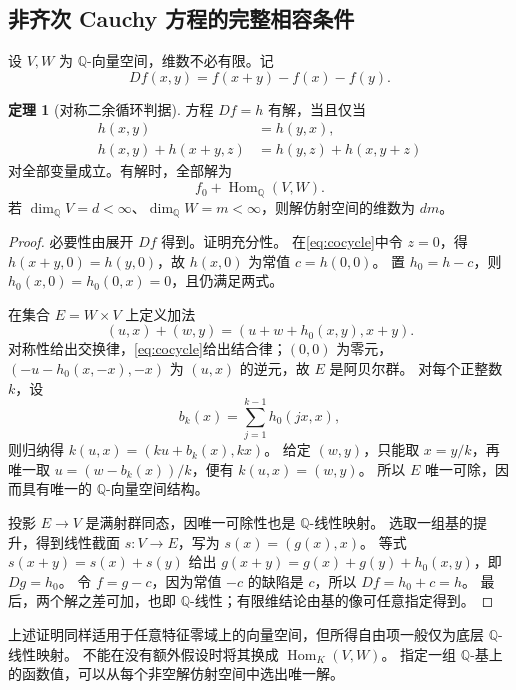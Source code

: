 \documentclass[UTF8,11pt,a4paper]{ctexart}
\theoremstyle{definition}
\newtheorem{theorem}{定理}[section]
\newcommand{\Q}{\mathbb Q}
\newcommand{\Hom}{\operatorname{Hom}}
\numberwithin{equation}{section}
\begin{document}
\subsection{非齐次 Cauchy 方程的完整相容条件}
设 $V,W$ 为 $\Q$-向量空间，维数不必有限。记
\[
 Df(x,y)=f(x+y)-f(x)-f(y).
\]
\begin{theorem}[对称二余循环判据]\label{thm:cocycle}
方程 $Df=h$ 有解，当且仅当
\begin{align}
 h(x,y)&=h(y,x),\label{eq:sym}\\
 h(x,y)+h(x+y,z)&=h(y,z)+h(x,y+z)\label{eq:cocycle}
\end{align}
对全部变量成立。有解时，全部解为
\[
 f_0+\Hom_{\Q}(V,W).
\]
若 $\dim_{\Q}V=d<\infty$、$\dim_{\Q}W=m<\infty$，则解仿射空间的维数为 $dm$。
\end{theorem}
\begin{proof}
必要性由展开 $Df$ 得到。证明充分性。
在\eqref{eq:cocycle}中令 $z=0$，得 $h(x+y,0)=h(y,0)$，故 $h(x,0)$ 为常值 $c=h(0,0)$。
置 $h_0=h-c$，则 $h_0(x,0)=h_0(0,x)=0$，且仍满足两式。

在集合 $E=W\times V$ 上定义加法
\[
 (u,x)+(w,y)=(u+w+h_0(x,y),x+y).
\]
对称性给出交换律，\eqref{eq:cocycle}给出结合律；$(0,0)$ 为零元，
$(-u-h_0(x,-x),-x)$ 为 $(u,x)$ 的逆元，故 $E$ 是阿贝尔群。
对每个正整数 $k$，设
\[
 b_k(x)=\sum_{j=1}^{k-1}h_0(jx,x),
\]
则归纳得 $k(u,x)=(ku+b_k(x),kx)$。
给定 $(w,y)$，只能取 $x=y/k$，再唯一取 $u=(w-b_k(x))/k$，便有 $k(u,x)=(w,y)$。
所以 $E$ 唯一可除，因而具有唯一的 $\Q$-向量空间结构。

投影 $E\to V$ 是满射群同态，因唯一可除性也是 $\Q$-线性映射。
选取一组基的提升，得到线性截面 $s:V\to E$，写为 $s(x)=(g(x),x)$。
等式 $s(x+y)=s(x)+s(y)$ 给出
$g(x+y)=g(x)+g(y)+h_0(x,y)$，即 $Dg=h_0$。
令 $f=g-c$，因为常值 $-c$ 的缺陷是 $c$，所以 $Df=h_0+c=h$。
最后，两个解之差可加，也即 $\Q$-线性；有限维结论由基的像可任意指定得到。
\end{proof}
上述证明同样适用于任意特征零域上的向量空间，但所得自由项一般仅为底层 $\Q$-线性映射。
不能在没有额外假设时将其换成 $\Hom_K(V,W)$。
指定一组 $\Q$-基上的函数值，可以从每个非空解仿射空间中选出唯一解。
\end{document}
